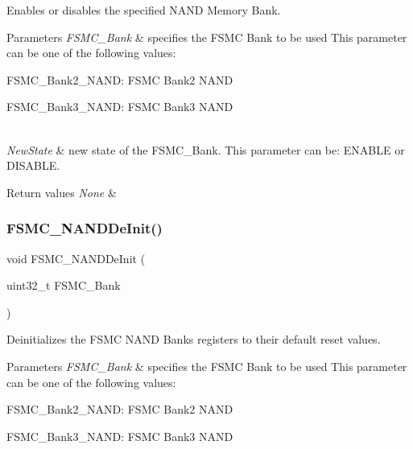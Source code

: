 Enables or disables the specified N\+A\+ND Memory Bank. 


\begin{DoxyParams}{Parameters}
{\em F\+S\+M\+C\+\_\+\+Bank} & specifies the F\+S\+MC Bank to be used This parameter can be one of the following values\+: \begin{DoxyItemize}
\item F\+S\+M\+C\+\_\+\+Bank2\+\_\+\+N\+A\+ND\+: F\+S\+MC Bank2 N\+A\+ND \item F\+S\+M\+C\+\_\+\+Bank3\+\_\+\+N\+A\+ND\+: F\+S\+MC Bank3 N\+A\+ND \end{DoxyItemize}
\\
\hline
{\em New\+State} & new state of the F\+S\+M\+C\+\_\+\+Bank. This parameter can be\+: E\+N\+A\+B\+LE or D\+I\+S\+A\+B\+LE. \\
\hline
\end{DoxyParams}

\begin{DoxyRetVals}{Return values}
{\em None} & \\
\hline
\end{DoxyRetVals}
\mbox{\label{group___f_s_m_c___private___functions_gafb749503293474a68555961bd8f120e1}} 
\subsubsection{\texorpdfstring{FSMC\_NANDDeInit()}{FSMC\_NANDDeInit()}}
{\footnotesize\ttfamily void F\+S\+M\+C\+\_\+\+N\+A\+N\+D\+De\+Init (\begin{DoxyParamCaption}\item[{uint32\+\_\+t}]{F\+S\+M\+C\+\_\+\+Bank }\end{DoxyParamCaption})}



Deinitializes the F\+S\+MC N\+A\+ND Banks registers to their default reset values. 


\begin{DoxyParams}{Parameters}
{\em F\+S\+M\+C\+\_\+\+Bank} & specifies the F\+S\+MC Bank to be used This parameter can be one of the following values\+: \begin{DoxyItemize}
\item F\+S\+M\+C\+\_\+\+Bank2\+\_\+\+N\+A\+ND\+: F\+S\+MC Bank2 N\+A\+ND \item F\+S\+M\+C\+\_\+\+Bank3\+\_\+\+N\+A\+ND\+: F\+S\+MC Bank3 N\+A\+ND \end{DoxyItemize}
\\
\hline
\end{DoxyParams}

